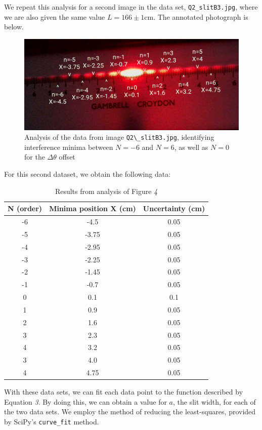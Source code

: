 \documentclass[a4paper]{article}
\begin{document}
We repeat this analysis for a second image in the data set, \lstinline$Q2_slitB3.jpg$, where we are also given the same value $L=166\pm1 \text{cm}$. The annotated photograph is below.

\begin{figure}[h!]
\centerline{\includegraphics[scale=0.6]{L166pm1b.png}}
\caption{Analysis of the data from image {\lstinline$Q2\_slitB3.jpg$}, identifying interference minima between $N=-6$ and $N=6$, as well as $N=0$ for the $\Delta\theta$ offset}
\label{fig:l116pm1b}
\end{figure}
\newpage
For this second dataset, we obtain the following data:

\begin{table}[h!]
\centering
\begin{tabular}{ccc}
\hline
N (order) & Minima position X (cm) & Uncertainty (cm)\\ \hline
-6 & -4.5 & 0.05 \\
-5 & -3.75 & 0.05 \\
-4 & -2.95 & 0.05 \\
-3 & -2.25 & 0.05 \\
-2 & -1.45 & 0.05 \\
-1 & -0.7 & 0.05 \\
0 & 0.1 & 0.1 \\
1 & 0.9 & 0.05 \\
2 & 1.6 & 0.05 \\
3 & 2.3 & 0.05 \\
4 & 3.2 & 0.05 \\
3 & 4.0 & 0.05 \\
4 & 4.75 & 0.05 \\
\end{tabular}
\caption{\label{tab:l116b_table}Results from analysis of Figure \emph{4}}
\end{table}

With these data sets, we can fit each data point to the function described by Equation \emph{3}. By doing this, we can obtain a value for $a$, the slit width, for each of the two data sets. We employ the method of reducing the least-squares, provided by SciPy's \lstinline$curve_fit$ method. 
\end{document}
